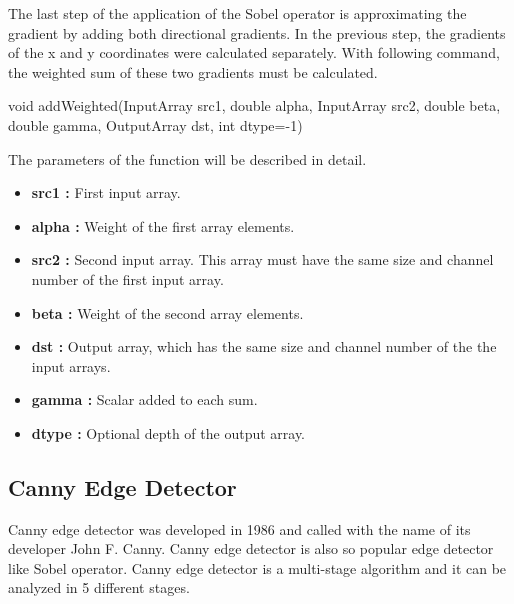 The last step of the application of the Sobel operator is approximating the gradient by adding both directional gradients. In the previous step, the gradients of the x and y coordinates were calculated separately. With following command, the weighted sum of these two gradients must be calculated.\cite{addWeighted}

 \begin{center}
 
void addWeighted(InputArray src1, double alpha, InputArray src2, double beta, double gamma, OutputArray dst, int dtype=-1)
 
  \end{center}
  
  The parameters of the function will be described in detail.
  
    \begin{itemize}

\item \textbf{src1 : }First input array.

\item \textbf{alpha : }Weight of the first array elements.

\item \textbf{src2 : }Second input array. This array must have the same size and channel number of the first input array.

\item \textbf{beta : }Weight of the second array elements.

\item \textbf{dst : }Output array, which has the same size and channel number of the the input arrays.

\item \textbf{gamma : }Scalar added to each sum.

\item \textbf{dtype : }Optional depth of the output array.

 \end{itemize}
 
%
\subsection{Canny Edge Detector}\label{sec:Canny Edge Detector}

Canny edge detector was developed in 1986 and called with the name of its developer John F. Canny. Canny edge detector is also so popular edge detector like Sobel operator. Canny edge detector is a multi-stage algorithm and it can be analyzed in 5 different stages.\cite{Canny_Edge_Detector2}

